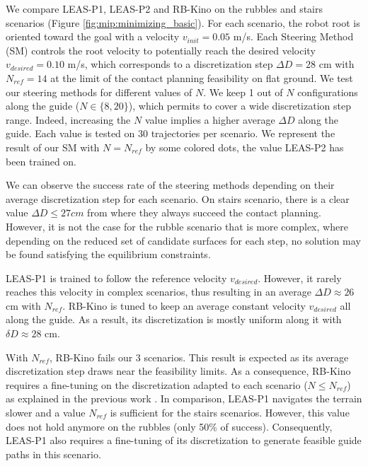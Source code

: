 We compare LEAS-P1, LEAS-P2 and RB-Kino on the rubbles and stairs scenarios (Figure \ref{fig:mip:minimizing_basic}).
For each scenario, the robot root is oriented toward the goal with a velocity $v_{init}=0.05$ m/s.
Each Steering Method (SM) controls the root velocity to potentially reach the desired velocity $v_{desired}=0.10$ m/s, which corresponds to a discretization step $\Delta D=28$ cm with $N_{ref}=14$ at the limit of the contact planning feasibility on flat ground.
We test our steering methods for different values of $N$. 
We keep 1 out of $N$ configurations along the guide ($N \in \{8,20\}$), which permits to cover a wide discretization step range.
Indeed, increasing the $N$ value implies a higher average $\Delta D$ along the guide.
Each value is tested on 30 trajectories per scenario.
We represent the result of our SM with $N=N_{ref}$ by some colored dots, the value LEAS-P2 has been trained on.

We can observe the success rate of the steering methods depending on their average discretization step for each scenario.
On stairs scenario, there is a clear value $\Delta D \leq 27 cm$ from where they always succeed the contact planning.
However, it is not the case for the rubble scenario that is more complex, where depending on the reduced set of candidate surfaces for each step, no solution may be found satisfying the equilibrium constraints.

LEAS-P1 is trained to follow the reference velocity $v_{desired}$.
However, it rarely reaches this velocity in complex scenarios, thus resulting in an average $\Delta D \approx 26$ cm with $N_{ref}$.
RB-Kino is tuned to keep an average constant velocity $v_{desired}$ all along the guide. As a result, its discretization is mostly uniform along it with $\delta D \approx 28$ cm.

With $N_{ref}$, RB-Kino fails our 3 scenarios. This result is expected as its average discretization step draws near the feasibility limits.
As a consequence, RB-Kino requires a fine-tuning on the discretization adapted to each scenario ($N \leq N_{ref}$) as explained in the previous work \cite{sl1m_v2}.
In comparison, LEAS-P1 navigates the terrain slower and a value $N_{ref}$ is sufficient for the stairs scenarios. 
However, this value does not hold anymore on the rubbles (only 50\% of success). 
Consequently, LEAS-P1 also requires a fine-tuning of its discretization to generate feasible guide paths in this scenario.

